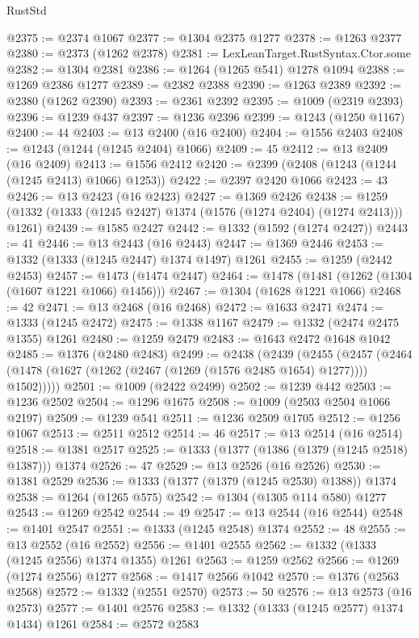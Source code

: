 \begin{lexlean}{RustStd}
\begin{coremodule}
@2375 := @2374 @1067
@2377 := @1304 @2375 @1277
@2378 := @1263 @2377
@2380 := @2373 (@1262 @2378)
@2381 := LexLeanTarget.RustSyntax.Ctor.some
@2382 := @1304 @2381
@2386 := @1264 (@1265 @541) @1278 @1094
@2388 := @1269 @2386 @1277
@2389 := @2382 @2388
@2390 := @1263 @2389
@2392 := @2380 (@1262 @2390)
@2393 := @2361 @2392
@2395 := @1009 (@2319 @2393)
@2396 := @1239 @437
@2397 := @1236 @2396
@2399 := @1243 (@1250 @1167)
@2400 := 44
@2403 := @13 @2400 (@16 @2400)
@2404 := @1556 @2403
@2408 := @1243 (@1244 (@1245 @2404) @1066)
@2409 := 45
@2412 := @13 @2409 (@16 @2409)
@2413 := @1556 @2412
@2420 := @2399 (@2408 (@1243 (@1244 (@1245 @2413) @1066) @1253))
@2422 := @2397 @2420 @1066
@2423 := 43
@2426 := @13 @2423 (@16 @2423)
@2427 := @1369 @2426
@2438 := @1259 (@1332 (@1333 (@1245 @2427) @1374 (@1576 (@1274 @2404) (@1274 @2413))) @1261)
@2439 := @1585 @2427
@2442 := @1332 (@1592 (@1274 @2427))
@2443 := 41
@2446 := @13 @2443 (@16 @2443)
@2447 := @1369 @2446
@2453 := @1332 (@1333 (@1245 @2447) @1374 @1497) @1261
@2455 := @1259 (@2442 @2453)
@2457 := @1473 (@1474 @2447)
@2464 := @1478 (@1481 (@1262 (@1304 (@1607 @1221 @1066) @1456)))
@2467 := @1304 (@1628 @1221 @1066)
@2468 := 42
@2471 := @13 @2468 (@16 @2468)
@2472 := @1633 @2471
@2474 := @1333 (@1245 @2472)
@2475 := @1338 @1167
@2479 := @1332 (@2474 @2475 @1355) @1261
@2480 := @1259 @2479
@2483 := @1643 @2472 @1648 @1042
@2485 := @1376 (@2480 @2483)
@2499 := @2438
    (@2439
      (@2455
        (@2457 (@2464 (@1478 (@1627 (@1262 (@2467 (@1269 (@1576 @2485 @1654) @1277)))) @1502)))))
@2501 := @1009 (@2422 @2499)
@2502 := @1239 @442
@2503 := @1236 @2502
@2504 := @1296 @1675
@2508 := @1009 (@2503 @2504 @1066 @2197)
@2509 := @1239 @541
@2511 := @1236 @2509 @1705
@2512 := @1256 @1067
@2513 := @2511 @2512
@2514 := 46
@2517 := @13 @2514 (@16 @2514)
@2518 := @1381 @2517
@2525 := @1333 (@1377 (@1386 (@1379 (@1245 @2518) @1387))) @1374
@2526 := 47
@2529 := @13 @2526 (@16 @2526)
@2530 := @1381 @2529
@2536 := @1333 (@1377 (@1379 (@1245 @2530) @1388)) @1374
@2538 := @1264 (@1265 @575)
@2542 := @1304 (@1305 @114 @580) @1277
@2543 := @1269 @2542
@2544 := 49
@2547 := @13 @2544 (@16 @2544)
@2548 := @1401 @2547
@2551 := @1333 (@1245 @2548) @1374
@2552 := 48
@2555 := @13 @2552 (@16 @2552)
@2556 := @1401 @2555
@2562 := @1332 (@1333 (@1245 @2556) @1374 @1355) @1261
@2563 := @1259 @2562
@2566 := @1269 (@1274 @2556) @1277
@2568 := @1417 @2566 @1042
@2570 := @1376 (@2563 @2568)
@2572 := @1332 (@2551 @2570)
@2573 := 50
@2576 := @13 @2573 (@16 @2573)
@2577 := @1401 @2576
@2583 := @1332 (@1333 (@1245 @2577) @1374 @1434) @1261
@2584 := @2572 @2583

\end{coremodule}
\end{lexlean}

